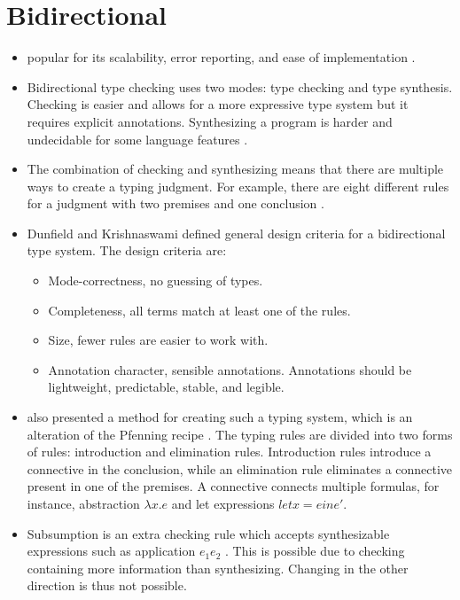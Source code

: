 \section{Bidirectional}

\begin{itemize}
    \item popular for its scalability, error reporting, and ease of implementation \cite{bidir-gadts}.
    \item Bidirectional type checking uses two modes: type checking and type synthesis. Checking is easier and allows for a more expressive type system but it requires explicit annotations. Synthesizing a program is harder and undecidable for some language features \cite{bidir}.
    \item The combination of checking and synthesizing means that there are multiple ways to create a typing judgment. For example, there are eight different rules for a judgment with two premises and one conclusion \cite{bidir}.   
   \item Dunfield and Krishnaswami \cite{bidir} defined general design criteria for a bidirectional type system. The design criteria are:
   \begin{itemize}
       \item Mode-correctness, no guessing of types.
       \item Completeness, all terms match at least one of the rules.
       \item Size, fewer rules are easier to work with.
       \item Annotation character, sensible annotations. Annotations should be lightweight, predictable, stable, and legible.
   \end{itemize}
   \item \cite{bidir} also presented a method for creating such a typing system, which is an alteration of the Pfenning recipe \cite{pfenning-recipe}. 
   The typing rules are divided into two forms of rules: introduction and elimination rules. Introduction rules introduce a connective in the conclusion, while an elimination rule eliminates a connective present in one of the premises. A connective connects multiple formulas, for instance, abstraction $\lambda x. e$ and let expressions $let x = e in e'$.
   \item Subsumption is an extra checking rule which accepts synthesizable expressions such as application $e_1 e_2$ \cite{bidir}. This is possible due to checking containing more information than synthesizing. Changing in the other direction is thus not possible. 
   
   
\end{itemize}